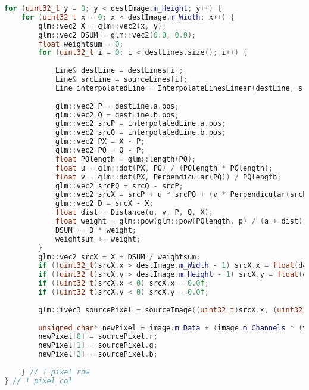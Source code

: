 \begin{minipage}{\textwidth}
\begin{lstlisting}[language=C++, caption=Beier-Neely in C++, label=bncode, xleftmargin=0.5cm]
for (uint32_t y = 0; y < destImage.m_Height; y++) {
	for (uint32_t x = 0; x < destImage.m_Width; x++) {
		glm::vec2 X = glm::vec2(x, y);
		glm::vec2 DSUM = glm::vec2(0.0, 0.0);
		float weightsum = 0;     
		for (uint32_t i = 0; i < destLines.size(); i++) {
			
			Line& destLine = destLines[i];
			Line& srcLine = sourceLines[i];
			Line interpolatedLine = InterpolateLinesLinear(destLine, srcLine, pct);
			
			glm::vec2 P = destLine.a.pos;
			glm::vec2 Q = destLine.b.pos;
			glm::vec2 srcP = interpolatedLine.a.pos;
			glm::vec2 srcQ = interpolatedLine.b.pos;
			glm::vec2 PX = X - P;
			glm::vec2 PQ = Q - P;
			float PQlength = glm::length(PQ);
			float u = glm::dot(PX, PQ) / (PQlength * PQlength);
			float v = glm::dot(PX, Perpendicular(PQ)) / PQlength;
			glm::vec2 srcPQ = srcQ - srcP;
			glm::vec2 srcX = srcP + u * srcPQ + (v * Perpendicular(srcPQ) / glm::length(srcPQ));
			glm::vec2 D = srcX - X;
			float dist = Distance(u, v, P, Q, X);
			float weight = glm::pow(glm::pow(PQlength, p) / (a + dist), b);
			DSUM += D * weight;
			weightsum += weight;        
		}                
		glm::vec2 srcX = X + DSUM / weightsum;
		if ((uint32_t)srcX.x > destImage.m_Width - 1) srcX.x = float(destImage.m_Width - 1);
		if ((uint32_t)srcX.y > destImage.m_Height - 1) srcX.y = float(destImage.m_Height - 1);
		if ((uint32_t)srcX.x < 0) srcX.x = 0.0f;
		if ((uint32_t)srcX.y < 0) srcX.y = 0.0f;                
		
		glm::ivec3 sourcePixel = sourceImage((uint32_t)srcX.x, (uint32_t)srcX.y);                
		
		unsigned char* newPixel = image.m_Data + (image.m_Channels * (y * image.m_Width + x));
		newPixel[0] = sourcePixel.r;
		newPixel[1] = sourcePixel.g;
		newPixel[2] = sourcePixel.b;
		
	} // ! pixel row
} // ! pixel col    
\end{lstlisting}
\end{minipage}



